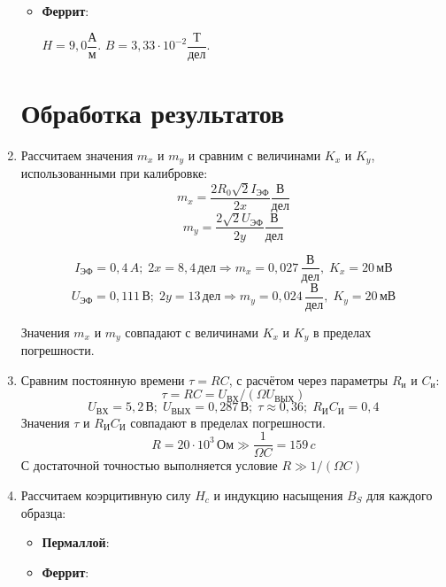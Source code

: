 \begin{enumerate}
\begin{itemize}
	\item	\textbf{Феррит}:
	
	$H=9,0 \dfrac{А}{м}.$
	$B=3,33 \cdot 10^{-2} \dfrac{Т}{дел}.$
	
\end{itemize}

\section{Обработка результатов}

\item Рассчитаем значения $m_x$ и $m_y$  и сравним с величинами $K_x$ и $K_y$, использованными при калибровке: \\
\[
m_x = \frac{2 R_0 \sqrt{2}I_{ЭФ} }{2x} \frac{В}{дел}
\]
\[
m_y = \frac{2 \sqrt{2}U_{ЭФ} }{2y} \frac{В}{дел}
\]

\[
I_{ЭФ} = 0,4 \, A; \; 2x = 8,4 \, дел \Rightarrow m_x = 0,027 \, \frac{В}{дел}, \; K_x = 20 \, мВ 
\]
\[
U_{ЭФ} = 0,111 \, В; \; 2y = 13 \, дел \Rightarrow m_y = 0,024 \, \frac{В}{дел}, \; K_y = 20 \, мВ 
\]

Значения $m_x$ и $m_y$ совпадают с величинами $K_x$ и $K_y$ в пределах погрешности. \\

\item Сравним постоянную времени $\tau = RC$, с расчётом через параметры  $R_и$  и $C_и$: \\
\[
\tau = RC = U_{ВХ} / (\Omega U_{ВЫХ}) 
\]
\[
U_{ВХ} = 5,2 \, В; \; U_{ВЫХ} = 0,287 \, В; \; \tau \approx 0,36; \; R_И C_И = 0,4
\]
Значения $\tau$ и $R_И C_И$ совпадают в пределах погрешности.
\[
R = 20 \cdot 10^3 \, Ом \gg \frac{1}{\Omega C} = 159 \, c
\]
С достаточной точностью выполняется условие $R \gg 1/(\Omega C)$
\item Рассчитаем коэрцитивную силу $H_c$ и индукцию насыщения $B_S$ для каждого образца:\\

\begin{itemize}
	
	\item	\textbf{Пермаллой}:
	
	
	\item	\textbf{Феррит}:
	
\end{itemize}



\end{enumerate}
